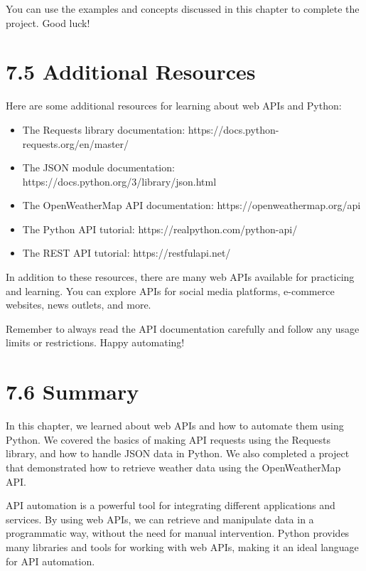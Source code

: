 \documentclass[
  paper=a4,
  ,captions=tableheading
]{scrartcl}
\providecommand{\tightlist}{%
  \setlength{\itemsep}{0pt}\setlength{\parskip}{0pt}}
\begin{document}
You can use the examples and concepts discussed in this chapter to
complete the project. Good luck!

\hypertarget{additional-resources}{%
\section{7.5 Additional Resources}\label{additional-resources}}

Here are some additional resources for learning about web APIs and
Python:

\begin{itemize}
\tightlist
\item
  The Requests library documentation:
  https://docs.python-requests.org/en/master/
\item
  The JSON module documentation:
  https://docs.python.org/3/library/json.html
\item
  The OpenWeatherMap API documentation: https://openweathermap.org/api
\item
  The Python API tutorial: https://realpython.com/python-api/
\item
  The REST API tutorial: https://restfulapi.net/
\end{itemize}

In addition to these resources, there are many web APIs available for
practicing and learning. You can explore APIs for social media
platforms, e-commerce websites, news outlets, and more.

Remember to always read the API documentation carefully and follow any
usage limits or restrictions. Happy automating!

\hypertarget{summary-3}{%
\section{7.6 Summary}\label{summary-3}}

In this chapter, we learned about web APIs and how to automate them
using Python. We covered the basics of making API requests using the
Requests library, and how to handle JSON data in Python. We also
completed a project that demonstrated how to retrieve weather data using
the OpenWeatherMap API.

API automation is a powerful tool for integrating different applications
and services. By using web APIs, we can retrieve and manipulate data in
a programmatic way, without the need for manual intervention. Python
provides many libraries and tools for working with web APIs, making it
an ideal language for API automation.
\end{document}

